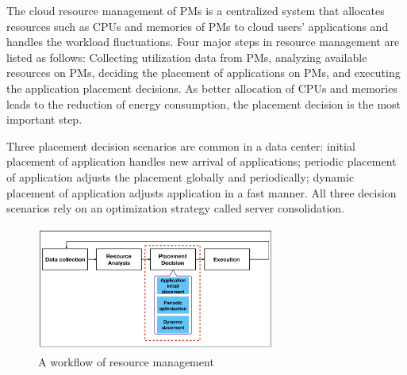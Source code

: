  The cloud resource management of PMs is a centralized system \cite{Jennings:2015ht} that allocates resources such as CPUs and memories of PMs to cloud users' applications and handles the workload fluctuations. Four major steps in resource management are listed as follows: Collecting utilization data from PMs, analyzing available resources on PMs, deciding the placement of applications on PMs, and executing the application placement decisions.  As better allocation of CPUs and memories leads to the reduction of energy consumption, the placement decision is the most important step.

 Three placement decision scenarios are common in a data center: initial placement of application handles new arrival of applications; periodic placement of application adjusts the placement globally and periodically; dynamic placement of application adjusts application in a fast manner. All three decision scenarios rely on an optimization strategy called server consolidation. 
\begin{figure}
	\centering
	\includegraphics[width=0.7\textwidth]{pics/workflow_management.png}
	\caption{A workflow of resource management \cite{Mishra:2012kx}}
	\label{fig:workflow}
\end{figure}




